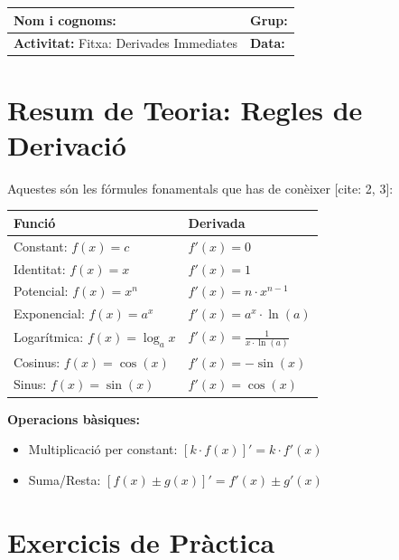 \documentclass[12pt,a4paper]{article}
\begin{document}
\begingroup
\renewcommand{\arraystretch}{2.2}
\begin{tabularx}{\textwidth}{|X|p{4cm}|}
    \hline
    \textbf{Nom i cognoms:} & \textbf{Grup:} \\ \hline
    \textbf{Activitat:} Fitxa: Derivades Immediates & \textbf{Data:} \\ \hline
\end{tabularx}
\endgroup

\vspace{0.5cm}


\section*{Resum de Teoria: Regles de Derivació}
Aquestes són les fórmules fonamentals que has de conèixer [cite: 2, 3]:

\begin{center}
\renewcommand{\arraystretch}{1.5}
\begin{tabular}{|l|l|}
\hline
\textbf{Funció} & \textbf{Derivada} \\ \hline
Constant: $f(x) = c$ & $f'(x) = 0$ \\ \hline
Identitat: $f(x) = x$ & $f'(x) = 1$ \\ \hline
Potencial: $f(x) = x^n$ & $f'(x) = n \cdot x^{n-1}$ \\ \hline
Exponencial: $f(x) = a^x$ & $f'(x) = a^x \cdot \ln(a)$ \\ \hline
Logarítmica: $f(x) = \log_a x$ & $f'(x) = \frac{1}{x \cdot \ln(a)}$ \\ \hline
Cosinus: $f(x) = \cos(x)$ & $f'(x) = -\sin(x)$ \\ \hline
Sinus: $f(x) = \sin(x)$ & $f'(x) = \cos(x)$ \\ \hline
\end{tabular}
\end{center}

\textbf{Operacions bàsiques:}
\begin{itemize}
    \item Multiplicació per constant: $[k \cdot f(x)]' = k \cdot f'(x)$
    \item Suma/Resta: $[f(x) \pm g(x)]' = f'(x) \pm g'(x)$
\end{itemize}

\section*{Exercicis de Pràctica}
\end{document}
